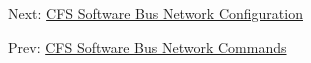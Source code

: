Next\-: \hyperlink{cfssbncfg}{C\-F\-S Software Bus Network Configuration} \par
 Prev\-: \hyperlink{cfssbncmds}{C\-F\-S Software Bus Network Commands} 